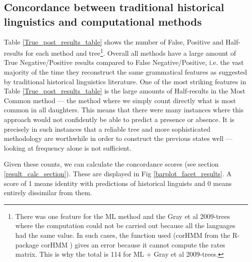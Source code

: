 \documentclass[12pt,letterpaper]{article}
\begin{document}
\subsection{Concordance between traditional historical linguistics and computational methods}
\label{sec:results_concorance}




Table \ref{True_post_results_table} shows the number of False, Positive and Half-results for each method and tree\footnote{There was one feature for the ML method and the Gray et al 2009-trees where the computation could not be carried out because all the languages had the same value. In such cases, the function used (corHMM from the R-package corHMM \citep{R-corHMM}) gives an error because it cannot compute the rates matrix. This is why the total is 114 for ML + Gray et al 2009-trees.}. Overall all methods have a large amount of True Negative/Positive results compared to False Negative/Positive, i.e. the vast majority of the time they reconstruct the same grammatical features as suggested by traditional historical linguistics literature. One of the most striking features in Table \ref{True_post_results_table} is the large amounts of Half-results in the Most Common method --- the method where we simply count directly what is most common in all daughters. This means that there were many instances where this approach would not confidently be able to predict a presence or absence. It is precisely in such instances that a reliable tree and more sophisticated methodology are worthwhile in order to construct the previous states well --- looking at frequency alone is not sufficient.



Given these counts, we can calculate the concordance scores (see section \ref{result_calc_section}). These are displayed in Fig \ref{barplot_facet_results}. A score of 1 means identity with predictions of historical linguists and 0 means entirely dissimilar from them.
\end{document}
